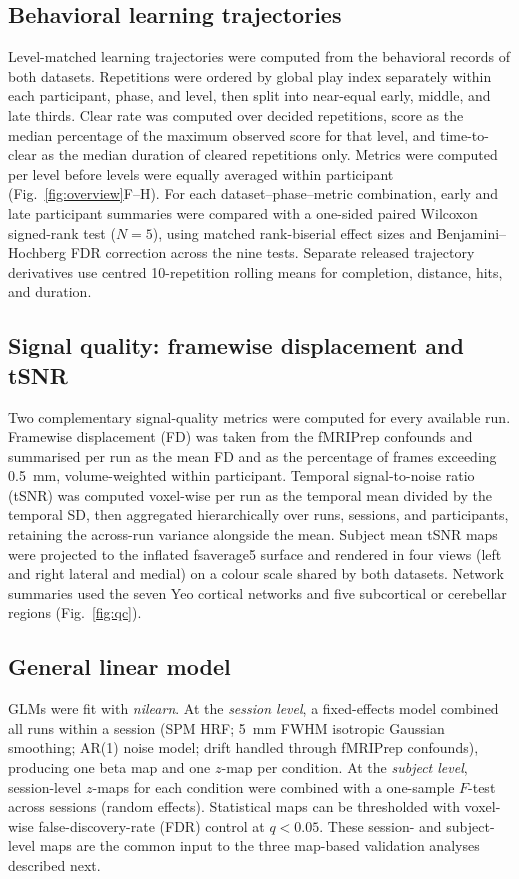 \documentclass{article}
\begin{document}
\subsection*{Behavioral learning trajectories}
Level-matched learning trajectories were computed from the behavioral records of both datasets.
Repetitions were ordered by global play index separately within each participant, phase, and
level, then split into near-equal early, middle, and late thirds. Clear rate was computed over
decided repetitions, score as the median percentage of the maximum observed score for that level,
and time-to-clear as the median duration of cleared repetitions only. Metrics were computed per
level before levels were equally averaged within participant (Fig.~\ref{fig:overview}F--H).
For each dataset--phase--metric combination, early and late participant summaries were compared
with a one-sided paired Wilcoxon signed-rank test ($N=5$), using matched rank-biserial effect
sizes and Benjamini--Hochberg FDR correction across the nine tests. Separate released trajectory
derivatives use centred 10-repetition rolling means for completion, distance, hits, and duration.

\subsection*{Signal quality: framewise displacement and tSNR}
Two complementary signal-quality metrics were computed for every available run. Framewise
displacement (FD) was taken from the fMRIPrep confounds and summarised per run as the mean FD
and as the percentage of frames exceeding 0.5~mm, volume-weighted within participant. Temporal
signal-to-noise ratio (tSNR) was computed voxel-wise per run as the temporal mean divided by the
temporal SD, then aggregated hierarchically over runs, sessions, and participants, retaining the
across-run variance alongside the mean. Subject mean tSNR maps were projected to the inflated
fsaverage5 surface and rendered in four views (left and right lateral and medial) on a colour
scale shared by both datasets. Network summaries used the seven Yeo cortical networks and five
subcortical or cerebellar regions (Fig.~\ref{fig:qc}).

\subsection*{General linear model}
GLMs were fit with \textit{nilearn}\cite{abraham2014nilearn}. At the \emph{session level}, a
fixed-effects model combined all runs within a session (SPM HRF; 5~mm FWHM isotropic Gaussian
smoothing; AR(1) noise model; drift handled through fMRIPrep confounds), producing one beta map
and one $z$-map per condition. At the \emph{subject level}, session-level $z$-maps for each
condition were combined with a one-sample $F$-test across sessions (random effects). Statistical
maps can be thresholded with voxel-wise false-discovery-rate (FDR) control at $q<0.05$. These
session- and subject-level maps are the common input to the three map-based validation analyses
described next.
\end{document}
